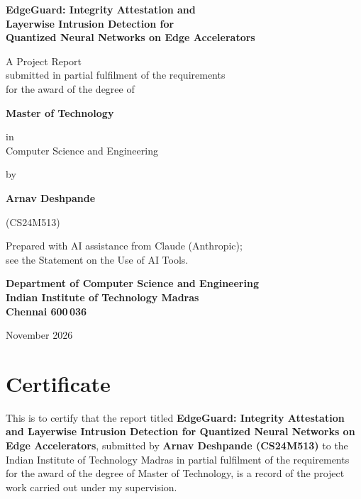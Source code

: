 \begin{titlepage}
\begin{center}
\vspace*{0cm}
{\LARGE\bfseries EdgeGuard: Integrity Attestation and\\[0.2cm]
Layerwise Intrusion Detection for\\[0.2cm]
Quantized Neural Networks on Edge Accelerators\par}
\vspace{1.0cm}
{\large A Project Report\\[0.2cm] submitted in partial fulfilment of the requirements\\
for the award of the degree of\par}
\vspace{0.6cm}
{\Large\bfseries Master of Technology\par}
\vspace{0.3cm}
{\large in\\[0.2cm] Computer Science and Engineering\par}
\vspace{0.9cm}
{\large by\par}
\vspace{0.3cm}
{\Large\bfseries Arnav Deshpande\par}
{\large (CS24M513)\par}
\vspace{0.5cm}
{\normalsize Prepared with AI assistance from Claude (Anthropic);\\
see the Statement on the Use of AI Tools.\par}
\vfill
{\large\bfseries Department of Computer Science and Engineering\\[0.15cm]
Indian Institute of Technology Madras\\[0.15cm]
Chennai 600\,036\par}
\vspace{0.4cm}
{\large November 2026\par}
\end{center}
\end{titlepage}

\chapter*{Certificate}
This is to certify that the report titled \textbf{EdgeGuard: Integrity Attestation and Layerwise
Intrusion Detection for Quantized Neural Networks on Edge Accelerators}, submitted by
\textbf{Arnav Deshpande (CS24M513)} to the Indian Institute of Technology Madras in partial
fulfilment of the requirements for the award of the degree of Master of Technology, is a
record of the project work carried out under my supervision.

